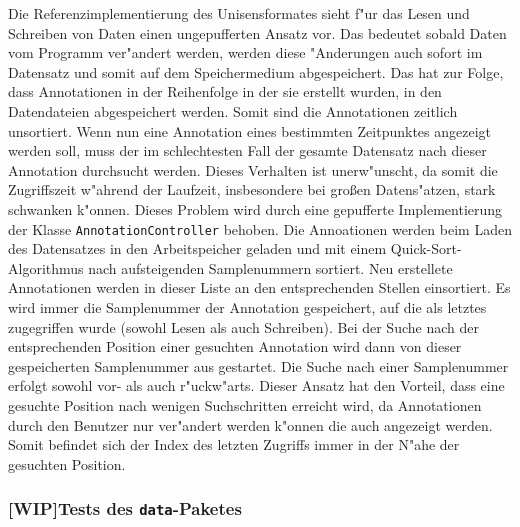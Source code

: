 Die Referenzimplementierung des Unisensformates sieht f"ur das Lesen und Schreiben von Daten einen ungepufferten Ansatz vor.
Das bedeutet sobald Daten vom Programm ver"andert werden, werden diese "Anderungen auch sofort im Datensatz und somit auf dem Speichermedium abgespeichert.
Das hat zur Folge, dass Annotationen in der Reihenfolge in der sie erstellt wurden, in den Datendateien abgespeichert werden.
Somit sind die Annotationen zeitlich unsortiert.
Wenn nun eine Annotation eines bestimmten Zeitpunktes angezeigt werden soll, muss der im schlechtesten Fall der gesamte Datensatz nach dieser Annotation durchsucht werden.
Dieses Verhalten ist unerw"unscht, da somit die Zugriffszeit w"ahrend der Laufzeit, insbesondere bei gro\ss en Datens"atzen, stark schwanken k"onnen.
Dieses Problem wird durch eine gepufferte Implementierung der Klasse \verb|AnnotationController| behoben.
Die Annoationen werden beim Laden des Datensatzes in den Arbeitspeicher geladen und mit einem Quick-Sort-Algorithmus nach aufsteigenden Samplenummern sortiert.
Neu erstellete Annotationen werden in dieser Liste an den entsprechenden Stellen einsortiert.
Es wird immer die Samplenummer der Annotation gespeichert, auf die als letztes zugegriffen wurde (sowohl Lesen als auch Schreiben).
Bei der Suche nach der entsprechenden Position einer gesuchten Annotation wird dann von dieser gespeicherten Samplenummer aus gestartet.
Die Suche nach einer Samplenummer erfolgt sowohl vor- als auch r"uckw"arts.
Dieser Ansatz hat den Vorteil, dass eine gesuchte Position nach wenigen Suchschritten erreicht wird, da Annotationen durch den Benutzer nur ver"andert werden k"onnen die auch angezeigt werden.
Somit befindet sich der Index des letzten Zugriffs immer in der N"ahe der gesuchten Position.

\subsubsection{[WIP]Tests des \texttt{data}-Paketes}






